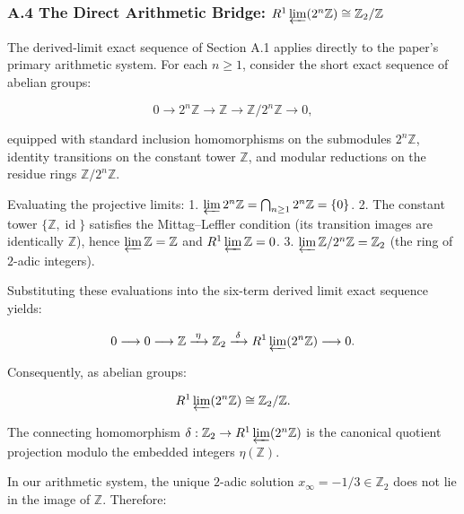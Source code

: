 \documentclass[
  11pt,
]{article}
\theoremstyle{plain}
\theoremstyle{definition}\newtheorem{definition}[theorem]{Definition}
\theoremstyle{remark}\newtheorem*{remark}{Remark}
\begin{document}
\subsubsection{\texorpdfstring{A.4 The Direct Arithmetic Bridge:
\(R^1 \varprojlim (2^n \mathbb{Z}) \cong \mathbb{Z}_2 / \mathbb{Z}\)}{A.4 The Direct Arithmetic Bridge: R\^{}1 \textbackslash varprojlim (2\^{}n \textbackslash mathbb\{Z\}) \textbackslash cong \textbackslash mathbb\{Z\}\_2 / \textbackslash mathbb\{Z\}}}\label{a.4-the-direct-arithmetic-bridge-r1-varprojlim-2n-mathbbz-cong-mathbbz_2-mathbbz}

The derived-limit exact sequence of Section A.1 applies directly to the
paper's primary arithmetic system. For each \(n \ge 1\), consider the
short exact sequence of abelian groups:

\[
0 \longrightarrow 2^n \mathbb{Z} \longrightarrow \mathbb{Z} \longrightarrow \mathbb{Z}/2^n \mathbb{Z} \longrightarrow 0,
\]

equipped with standard inclusion homomorphisms on the submodules
\(2^n \mathbb{Z}\), identity transitions on the constant tower
\(\mathbb{Z}\), and modular reductions on the residue rings
\(\mathbb{Z}/2^n \mathbb{Z}\).

Evaluating the projective limits: 1.
\(\varprojlim 2^n \mathbb{Z} = \bigcap_{n \ge 1} 2^n \mathbb{Z} = \{0\}\).
2. The constant tower \(\{\mathbb{Z}, \operatorname{id}\}\) satisfies
the Mittag--Leffler condition (its transition images are identically
\(\mathbb{Z}\)), hence \(\varprojlim \mathbb{Z} = \mathbb{Z}\) and
\(R^1 \varprojlim \mathbb{Z} = 0\). 3.
\(\varprojlim \mathbb{Z}/2^n \mathbb{Z} = \mathbb{Z}_2\) (the ring of
\(2\)-adic integers).

Substituting these evaluations into the six-term derived limit exact
sequence yields:

\[
0 \longrightarrow 0 \longrightarrow \mathbb{Z} \xrightarrow{\;\eta\;} \mathbb{Z}_2 \xrightarrow{\;\delta\;} R^1 \varprojlim (2^n \mathbb{Z}) \longrightarrow 0.
\]

Consequently, as abelian groups:

\[
R^1 \varprojlim (2^n \mathbb{Z}) \cong \mathbb{Z}_2 / \mathbb{Z}.
\]

The connecting homomorphism
\(\delta: \mathbb{Z}_2 \to R^1 \varprojlim (2^n \mathbb{Z})\) is the
canonical quotient projection modulo the embedded integers
\(\eta(\mathbb{Z})\).

In our arithmetic system, the unique \(2\)-adic solution
\(x_\infty = -1/3 \in \mathbb{Z}_2\) does not lie in the image of
\(\mathbb{Z}\). Therefore:
\end{document}
